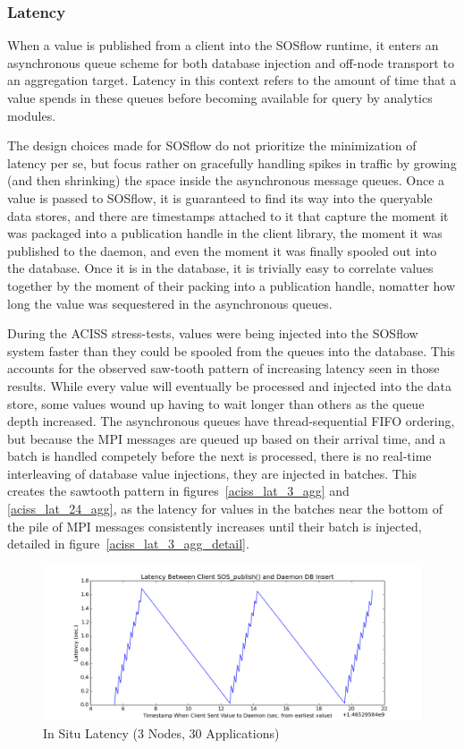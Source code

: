 \subsubsection{Latency} %
When a value is published from a client into the SOSflow runtime,
it enters an asynchronous queue scheme for both database injection
and off-node transport to an aggregation target.
%
Latency in this context refers to the amount of time that a value
spends in these queues before becoming available for query by
analytics modules.
%
\par
%
The design choices made for SOSflow do not prioritize the minimization
of latency per se, but focus rather on gracefully handling spikes in
traffic by growing (and then shrinking) the space inside the
asynchronous message queues.
%
Once a value is passed to SOSflow, it is guaranteed to find its
way into the queryable data stores, and there are timestamps attached
to it that capture the moment it was packaged into a publication handle in
the client library, the moment it was published to the daemon, and
even the moment it was finally spooled out into the database.
%
Once it is in the database, it is trivially easy to correlate values
together by the moment of their packing into a publication handle, nomatter
how long the value was sequestered in the asynchronous queues.
%
\par
%
During the ACISS stress-tests, values were being injected into the
SOSflow system faster than they could be spooled from the queues into
the database.  This accounts for the observed saw-tooth pattern of
increasing latency seen in those results.
%
While every value will eventually be processed and injected into the data
store, some values wound up having to wait longer than others as the queue
depth increased.
%
The asynchronous queues have thread-sequential FIFO ordering, but
because the MPI messages are queued up based on their arrival time,
and a batch is handled competely before the next is processed, there
is no real-time interleaving of database value injections, they are
injected in batches.
%
This creates the sawtooth pattern in figures~\ref{aciss_lat_3_agg} and
\ref{aciss_lat_24_agg}, as the latency for values in the batches near
the bottom of the pile of MPI messages consistently increases until
their batch is injected, detailed in
figure~\ref{aciss_lat_3_agg_detail}.
%
%


\begin{figure}[h]
\centering
\includegraphics[width=\columnwidth]{images/aciss_latency_3_situ.png}
\caption{In Situ Latency (3 Nodes, 30 Applications)}
\label{aciss_lat_3_situ}
\end{figure}

